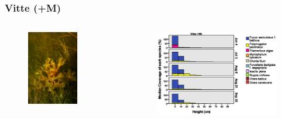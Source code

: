 \documentclass{beamer}
\begin{document}
\begin{frame}
\frametitle{Vitte (+M)}
\begin{columns}
\begin{column}{4.8cm}
\begin{figure}
\includegraphics[width=0.7\textwidth]{images/Fotos/DSCF0799.JPG} 
\end{figure}
\end{column}
\begin{column}{8.0cm}
\begin{figure}
\includegraphics[width=\textwidth]{images/Wuchshoehenkartierung/Vitte+Mb1.eps}
\end{figure}
\end{column}
\end{columns}
\end{frame}
\end{document}
